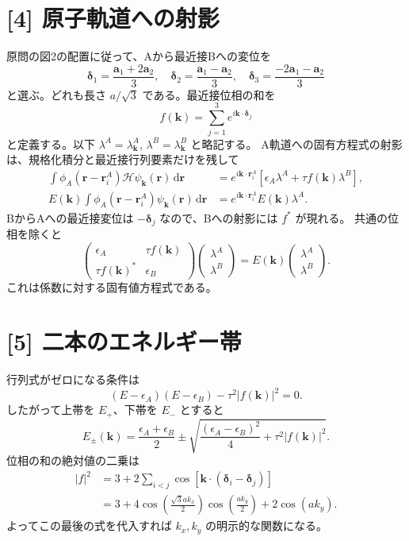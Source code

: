\documentclass[11pt,a4paper]{article}
\begin{document}
\section*{[4] 原子軌道への射影}
原問の図2の配置に従って、Aから最近接Bへの変位を
\begin{equation}
 \boldsymbol\delta_1=\frac{\boldsymbol a_1+2\boldsymbol a_2}{3},\quad
 \boldsymbol\delta_2=\frac{\boldsymbol a_1-\boldsymbol a_2}{3},\quad
 \boldsymbol\delta_3=\frac{-2\boldsymbol a_1-\boldsymbol a_2}{3}
\end{equation}
と選ぶ。どれも長さ $a/\sqrt3$ である。最近接位相の和を
\[
 f(\boldsymbol k)=\sum_{j=1}^3 e^{i\boldsymbol k\cdot\boldsymbol\delta_j}
\]
と定義する。以下 $\lambda^A=\lambda^A_{\boldsymbol k}$, $\lambda^B=\lambda^B_{\boldsymbol k}$ と略記する。
A軌道への固有方程式の射影は、規格化積分と最近接行列要素だけを残して
\begin{align}
 \int\phi_A(\boldsymbol r-\boldsymbol r_i^A)\mathcal H\psi_{\boldsymbol k}(\boldsymbol r)\,\mathrm d\boldsymbol r
 &=e^{i\boldsymbol k\cdot\boldsymbol r_i^A}
   [\epsilon_A\lambda^A+\tau f(\boldsymbol k)\lambda^B],\\
 E(\boldsymbol k)\int\phi_A(\boldsymbol r-\boldsymbol r_i^A)\psi_{\boldsymbol k}(\boldsymbol r)\,\mathrm d\boldsymbol r
 &=e^{i\boldsymbol k\cdot\boldsymbol r_i^A}E(\boldsymbol k)\lambda^A.
\end{align}
BからAへの最近接変位は $-\boldsymbol\delta_j$ なので、Bへの射影には $f^*$ が現れる。
共通の位相を除くと
\begin{equation}
 \boxed{\begin{pmatrix}\epsilon_A&\tau f(\boldsymbol k)\\\tau f(\boldsymbol k)^*&\epsilon_B\end{pmatrix}
 \begin{pmatrix}\lambda^A\\\lambda^B\end{pmatrix}
 =E(\boldsymbol k)\begin{pmatrix}\lambda^A\\\lambda^B\end{pmatrix}.}
\end{equation}
これは係数に対する固有値方程式である。

\section*{[5] 二本のエネルギー帯}
行列式がゼロになる条件は
\[
 (E-\epsilon_A)(E-\epsilon_B)-\tau^2|f(\boldsymbol k)|^2=0.
\]
したがって上帯を $E_+$、下帯を $E_-$ とすると
\begin{equation}
 \boxed{E_\pm(\boldsymbol k)=\frac{\epsilon_A+\epsilon_B}{2}
 \pm\sqrt{\frac{(\epsilon_A-\epsilon_B)^2}{4}+\tau^2|f(\boldsymbol k)|^2}.}
\end{equation}
位相の和の絶対値の二乗は
\begin{align}
 |f|^2&=3+2\sum_{i<j}\cos[\boldsymbol k\cdot(\boldsymbol\delta_i-\boldsymbol\delta_j)]\\
 &=3+4\cos\left(\frac{\sqrt3a k_x}{2}\right)\cos\left(\frac{a k_y}{2}\right)
       +2\cos(a k_y).
\end{align}
よってこの最後の式を代入すれば $k_x,k_y$ の明示的な関数になる。
\end{document}
